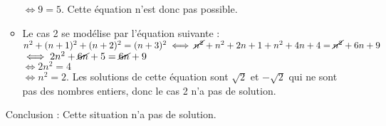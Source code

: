 \begin{enumerate}
\begin{itemize}
            \hspace*{4.95cm} $\iff 9 =5$. Cette équation n'est donc pas possible.
         \item Le cas 2 se modélise par l'équation suivante : \\
            $n^2+(n+1)^2+(n+2)^2 =(n+3)^2 \iff \cancel{n^2}+n^2+2n+1+n^2+4n+4 =\cancel{n^2}+6n+9$ \\
            \hspace*{4.95cm} $\iff 2n^2+\cancel{6n}+5 =\cancel{6n}+9$ \\
            \hspace*{4.95cm} $\iff 2n^2 =4$ \\
            \hspace*{4.95cm} $\iff n^2 =2$. Les solutions de cette équation sont $\sqrt2$ et $-\sqrt2$ qui ne sont pas des nombres entiers, donc le cas 2 n'a pas de solution.
      \end{itemize}
      Conclusion : {\blue Cette situation n'a pas de solution}.
   \end{enumerate}
